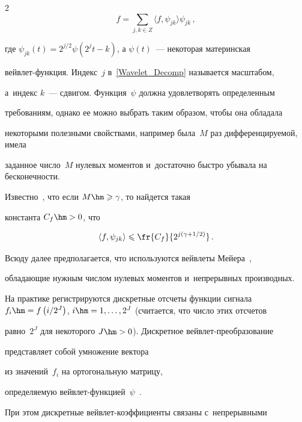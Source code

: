 \begin{multicols}{2}
\begin{equation}
\label{Wavelet_Decomp}

f=\sum\limits_{j,k\in Z}\langle f,\psi_{jk}\rangle\psi_{jk}\,,

\end{equation}

где $\psi_{jk}(t)=2^{j/2}\psi(2^jt-k)$, а $\psi(t)$~--- некоторая материнская 

вейв\-лет-функ\-ция. Индекс~$j$ в~\eqref{Wavelet_Decomp} называется масштабом, 

а~индекс $k$~--- сдвигом. Функция~$\psi$ должна удовле\-тво\-рять определенным 

требованиям, однако ее можно выбрать таким образом, чтобы она обладала 

некоторыми полезными свойствами, например была~$M$ раз дифференцируемой, имела

 заданное чис\-ло~$M$ нулевых моментов и~достаточно быст\-ро убывала на бес\-ко\-неч\-ности. 

 Известно~\cite{Mall99}, что если $M\hm\geqslant\gamma$, то найдется такая 

 константа $C_f\hm>0$, что

\begin{equation}

\label{Coeff_Decay}

\langle f,\psi_{jk}\rangle\leqslant\fr{C_f}{2^{j\left(\gamma+1/2\right)}}\,.

\end{equation}

Всюду далее предполагается, что используются вейв\-ле\-ты Мейера~\cite{Mall99}, 

обладающие нужным чис\-лом нулевых моментов и~непрерывных производных.



На практике регистрируются дискретные отсчеты функции сигнала $f_i\hm=

f\left(i/2^J\right)$, $i\hm=1,\ldots, 2^J$ (считается, что чис\-ло этих отсчетов 

равно~$2^J$ для некоторого $J\hm>0$). Дискретное вейв\-лет-пре\-обра\-зо\-ва\-ние 

пред\-став\-ля\-ет собой умножение вектора\linebreak

 из значений~$f_i$  на ортогональную мат\-ри\-цу, 

определяемую вейв\-лет-функ\-ци\-ей~$\psi$~\cite{Mall99}. 

При этом дискретные вейв\-лет-ко\-эф\-фи\-ци\-ен\-ты связаны с~непрерывными 


\end{multicols}
